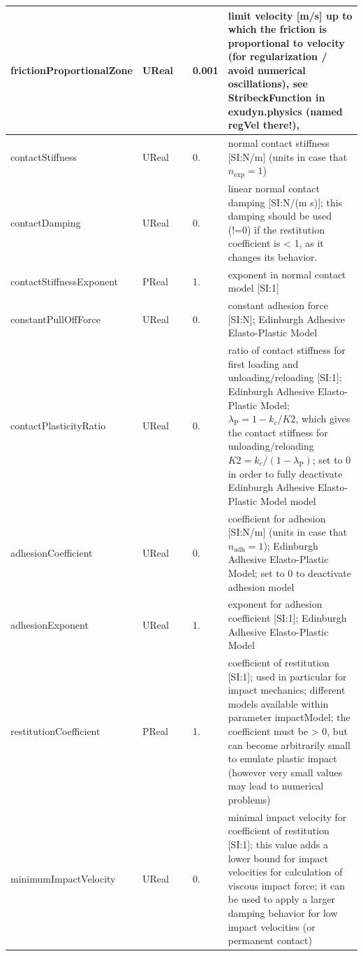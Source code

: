 \begin{center}
\begin{longtable}{| p{4.5cm} | p{2.5cm} | p{0.5cm} | p{2.5cm} | p{6cm} |}
    frictionProportionalZone &     UReal &      &     0.001 &     limit velocity [m/s] up to which the friction is proportional to velocity (for regularization / avoid numerical oscillations), see StribeckFunction in exudyn.physics (named regVel there!), {sec:module:physics}\\ \hline
    contactStiffness &     UReal &      &     0. &     normal contact stiffness [SI:N/m] (units in case that $n_\mathrm{exp}=1$)\\ \hline
    contactDamping &     UReal &      &     0. &     linear normal contact damping [SI:N/(m s)]; this damping should be used (!=0) if the restitution coefficient is < 1, as it changes its behavior.\\ \hline
    contactStiffnessExponent &     PReal &      &     1. &     exponent in normal contact model [SI:1]\\ \hline
    constantPullOffForce &     UReal &      &     0. &     constant adhesion force [SI:N]; Edinburgh Adhesive Elasto-Plastic Model\\ \hline
    contactPlasticityRatio &     UReal &      &     0. &     ratio of contact stiffness for first loading and unloading/reloading [SI:1]; Edinburgh Adhesive Elasto-Plastic Model; $\lambda_\mathrm{P}=1-k_c/K2$, which gives the contact stiffness for unloading/reloading $K2 = k_c/(1-\lambda_\mathrm{P})$; set to 0 in order to fully deactivate Edinburgh Adhesive Elasto-Plastic Model model\\ \hline
    adhesionCoefficient &     UReal &      &     0. &     coefficient for adhesion [SI:N/m] (units in case that $n_\mathrm{adh}=1$); Edinburgh Adhesive Elasto-Plastic Model; set to 0 to deactivate adhesion model\\ \hline
    adhesionExponent &     UReal &      &     1. &     exponent for adhesion coefficient [SI:1]; Edinburgh Adhesive Elasto-Plastic Model\\ \hline
    restitutionCoefficient &     PReal &      &     1. &     coefficient of restitution [SI:1]; used in particular for impact mechanics; different models available within parameter impactModel; the coefficient must be > 0, but can become arbitrarily small to emulate plastic impact (however very small values may lead to numerical problems)\\ \hline
    minimumImpactVelocity &     UReal &      &     0. &     minimal impact velocity for coefficient of restitution [SI:1]; this value adds a lower bound for impact velocities for calculation of viscous impact force; it can be used to apply a larger damping behavior for low impact velocities (or permanent contact)\\ \hline

\end{longtable}
\end{center}

